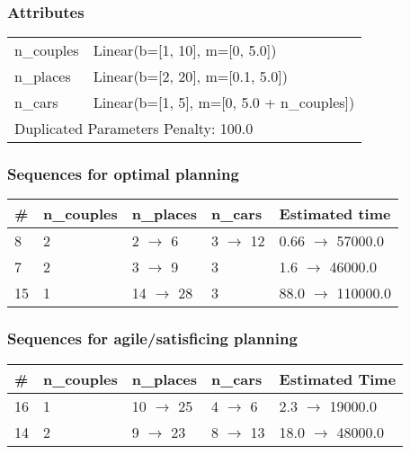 \documentclass{article}
\begin{document}
                    \subsubsection*{Attributes}
                    \begin{tabular}{@{}p{}p{}@{}}
                    \toprule
                    n\_couples & Linear(b=[1, 10], m=[0, 5.0])\\
n\_places & Linear(b=[2, 20], m=[0.1, 5.0])\\
n\_cars & Linear(b=[1, 5], m=[0, 5.0 + n\_couples]) \\
                    \bottomrule
                    \multicolumn{2}{l}{Duplicated Parameters Penalty: 100.0}
                    \end{tabular}
                
                            \subsubsection*{Sequences for optimal planning}

                            \begin{center}
                            \begin{tabular}{@{}l|l|l|l|l@{}}
                            \# & n\_couples & n\_places & n\_cars & Estimated time\\\midrule
                            8&2&2 $\rightarrow$ 6&3 $\rightarrow$ 12&0.66 $\rightarrow$ 57000.0\\
7&2&3 $\rightarrow$ 9&3&1.6 $\rightarrow$ 46000.0\\
15&1&14 $\rightarrow$ 28&3&88.0 $\rightarrow$ 110000.0
                            \end{tabular}
                            \end{center}
                    
                         \subsubsection*{Sequences for agile/satisficing planning}

                        \begin{center}
                        \begin{tabular}{@{}l|l|l|l|l@{}}
                        \# & n\_couples & n\_places & n\_cars & Estimated Time\\\midrule
                        16&1&10 $\rightarrow$ 25&4 $\rightarrow$ 6&2.3 $\rightarrow$ 19000.0\\
14&2&9 $\rightarrow$ 23&8 $\rightarrow$ 13&18.0 $\rightarrow$ 48000.0
                        \end{tabular}
                        \end{center}
                    
\end{document}
